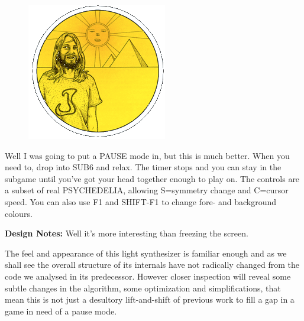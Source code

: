 \begin{definition}
\setlength{\intextsep}{0pt}%
\setlength{\columnsep}{3pt}%
\begin{figure}
\includegraphics[width=\linewidth]{src/callout/psych.png} 
\end{figure}
\small
Well I was going to put a PAUSE mode in, but this is much better. When you need to, drop into SUB6 and relax. The timer stops and you can stay in the subgame until you've got your head together enough to play on. The controls are a subset of real PSYCHEDELIA, allowing S=symmetry change and C=cursor speed. You can also use F1 and SHIFT-F1 to change fore- and background colours.

\textbf{Design Notes:} Well it's more interesting than freezing the screen.
\end{definition}

The feel and appearance of this light synthesizer is familiar enough and as we shall see the overall structure of its internals have not radically changed from the
code we analysed in its predecessor. However closer inspection will reveal some subtle changes in the algorithm, some optimization and simplifications,
that mean this is not just a desultory lift-and-shift of previous work to fill a gap in a game in need of a pause mode.

